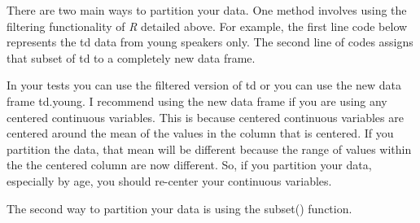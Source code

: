 \documentclass[
  12pt,
  letterpaper]{article}
\newenvironment{Shaded}{\begin{snugshade}}{\end{snugshade}}
\newcommand{\CommentTok}[1]{\textcolor[rgb]{0.37,0.37,0.37}{#1}}
\newcommand{\NormalTok}[1]{\textcolor[rgb]{0.00,0.23,0.31}{#1}}
\newcommand{\OtherTok}[1]{\textcolor[rgb]{0.00,0.23,0.31}{#1}}
\newcommand{\SpecialCharTok}[1]{\textcolor[rgb]{0.37,0.37,0.37}{#1}}
\newcommand{\StringTok}[1]{\textcolor[rgb]{0.13,0.47,0.30}{#1}}
\renewcommand\texttt[1]{{\ttfamily\color{BrickRed}#1}}
\begin{document}
There are two main ways to partition your data. One method involves
using the filtering functionality of \emph{R} detailed above. For
example, the first line code below represents the \texttt{td} data from
\texttt{young} speakers only. The second line of codes assigns that
subset of \texttt{td} to a completely new data frame.

\begin{Shaded}
\end{Shaded}

\begin{Shaded}
\end{Shaded}

In your tests you can use the filtered version of \texttt{td} or you can
use the new data frame \texttt{td.young}. I recommend using the new data
frame if you are using any centered continuous variables. This is
because centered continuous variables are centered around the mean of
the values in the column that is centered. If you partition the data,
that mean will be different because the range of values within the the
centered column are now different. So, if you partition your data,
especially by age, you should re-center your continuous variables.

The second way to partition your data is using the \texttt{subset()}
function.
\end{document}
